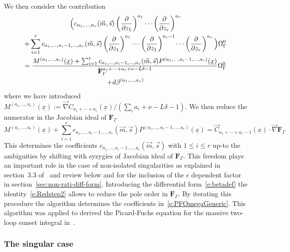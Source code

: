 \documentclass[a4paper,12pt]{article}
\numberwithin{equation}{section}
\numberwithin{figure}{section}
\begin{document}
We then consider the contribution
\begin{multline}
  \Big( c_{n_1,\dots,n_r}(\vec m,\vec s)
  \left(\partial\over \partial z_1\right)^{a_1}\cdots\left(\partial
  \over\partial z_r\right)^{a_r} \cr+\sum_{i=1}^r c_{a_1,\dots,n_i-1,\dots,a_r}(\vec m,\vec s)
  \left(\partial\over \partial z_1\right)^{a_1}\cdots  \left(\partial\over \partial z_1\right)^{a_i-1}\cdots\left(\partial
    \over\partial z_r\right)^{a_r} \Big)\Omega_\Gamma^0\cr
  ={M^{(a_1,\dots,a_r)}(\underline x)+\sum_{i=1}^r
    c_{a_1,\dots,a_i-1,\dots,a_r}(\vec m,\vec s)    P^{(a_1,\dots,a_i-1,\dots,a_r)}(\underline x) \over \textbf{F}_\Gamma^{a_1+\cdots+a_r+\nu-L\delta-1}} \Omega_\Gamma^0\cr+d\beta^{(a_1,\dots,a_r)}
\end{multline}
where we have introduced $M^{(a_1,\dots,a_r)}(\underline x):=\vec\nabla C_{a_1+\cdots+a_r} (\underline x)/ (\sum_i a_i+\nu-L\delta-1)$.
We then reduce the numerator in the Jacobian ideal of
$\textbf{F}_\Gamma$
\begin{equation}\label{e:Redstep2}
    M^{(a_1,\dots,a_r)}(\underline x)+\sum_{i=1}^r
    c_{a_1,\dots,a_i-1,\dots,a_r}(\vec m,\vec s)
    P^{(a_1,\dots,a_i-1,\dots,a_r)}(\underline x) 
    =\vec
    C_{a_1+\cdots+a_r-1}(\underline x)\cdot\vec \nabla\textbf{F}_\Gamma
\end{equation}
%
This determines the coefficients
$c_{a_1,\dots,a_i-1,\dots,a_r}(\vec m,\vec s) $ with $1\leq i\leq r$
up-to the ambiguities by shifting with syzygies of  Jacobian ideal of
$\textbf{F}_\Gamma$.  This freedom plays an important role in the case
of non-isolated singularities as explained in section~3.3 of~\cite{Lairez:2022zkj} and review
below and for the inclusion of the $\epsilon$ dependent factor in section~\ref{sec:non-rati-diff-form}.
Introducing the differential form~\eqref{e:betadef} the
identity~\eqref{e:Redstep2}  allows to reduce the pole order in $\textbf{F}_\Gamma$.
By iterating this procedure the algorithm determines the coefficients
in~\eqref{e:PFOmegaGeneric}. This algorithm was applied to derived the
Picard-Fuchs equation for the massive two-loop sunset integral in~\cite{Bloch:2016izu}.
\subsubsection{The singular case}
\label{sec:singular-case}
\end{document}
